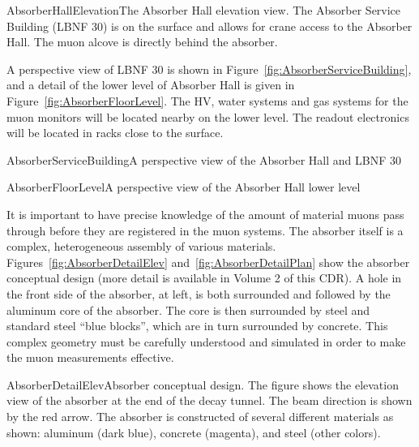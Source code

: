 \begin{cdrfigure}{AbsorberHallElevation}{The Absorber Hall elevation view. The Absorber Service Building (LBNF 30) is on the surface and allows for crane access 
to the Absorber Hall. The muon alcove is directly behind the absorber. }
\end{cdrfigure}

A perspective view of LBNF 30 is shown in Figure~\ref{fig:AbsorberServiceBuilding}, and a detail of the lower level of Absorber Hall
is given in Figure~\ref{fig:AbsorberFloorLevel}.  The HV, water systems and gas systems for the muon monitors will be located nearby on the lower level.
The readout electronics will be located in racks close to the surface. 

\begin{cdrfigure}{AbsorberServiceBuilding}{A perspective view of the Absorber Hall and LBNF 30}
\end{cdrfigure}

\begin{cdrfigure}{AbsorberFloorLevel}{A perspective view of the 
Absorber Hall lower level}
\end{cdrfigure}

It is important to have precise knowledge of the amount of material muons pass
through before they are registered in the muon systems. The absorber
itself is a complex, heterogeneous assembly of various
materials. 
Figures~\ref{fig:AbsorberDetailElev} and~\ref{fig:AbsorberDetailPlan} show the absorber conceptual design (more detail is available in Volume 2 of this CDR). A hole
in the front side of the absorber, at left, is both surrounded and followed by the
aluminum core of the absorber. The core is then surrounded by steel 
and standard steel ``blue blocks'', 
which are in turn surrounded by concrete.  This
complex geometry must be carefully understood and simulated in order
to make the muon measurements effective. 


\begin{cdrfigure}{AbsorberDetailElev}{Absorber conceptual design. The figure shows
the elevation view of the absorber at the end of the decay tunnel. The beam direction is shown by
the red arrow. The absorber is constructed of several different materials as shown: aluminum (dark blue), concrete (magenta), and steel (other colors).}
\end{cdrfigure}

